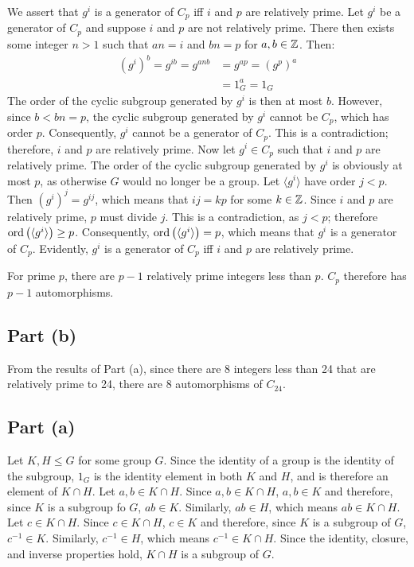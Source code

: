 \documentclass{article}
\begin{document}
We assert that $g^i$ is a generator of $C_p$ iff $i$ and $p$ are relatively prime. Let $g^i$ be a generator of $C_p$ and suppose $i$ and $p$ are not relatively prime. There then exists some integer $n > 1$ such that $an = i$ and $bn = p$ for $a, b \in \mathbb{Z}$. Then:
\begin{equation}
    \begin{split}
        \left(g^{i}\right)^b = g^{ib} = g^{anb} & = g^{ap} = \left(g^p\right)^a \\
        & = 1_G^a = 1_G
    \end{split}
\end{equation}
The order of the cyclic subgroup generated by $g^i$ is then at most $b$. However, since $b < bn = p$, the cyclic subgroup generated by $g^i$ cannot be $C_p$, which has order $p$. Consequently, $g^i$ cannot be a generator of $C_p$. This is a contradiction; therefore, $i$ and $p$ are relatively prime. Now let $g^i \in C_p$ such that $i$ and $p$ are relatively prime. The order of the cyclic subgroup generated by $g^i$ is obviously at most $p$, as otherwise $G$ would no longer be a group. Let $\langle g^i \rangle$ have order $j < p$. Then $\left(g^i\right)^j = g^{ij}$, which means that $ij = kp$ for some $k \in \mathbb{Z}$. Since $i$ and $p$ are relatively prime, $p$ must divide $j$. This is a contradiction, as $j < p$; therefore $\operatorname{ord}\left(\langle g^i \rangle\right) \geq p$. Consequently, $\operatorname{ord}\left(\langle g^i \rangle\right) = p$, which means that $g^i$ is a generator of $C_p$. Evidently, $g^i$ is a generator of $C_p$ iff $i$ and $p$ are relatively prime.

For prime $p$, there are $p - 1$ relatively prime integers less than $p$. $C_p$ therefore has $p - 1$ automorphisms.
\subsection*{Part (b)}
From the results of Part (a), since there are 8 integers less than 24 that are relatively prime to 24, there are 8 automorphisms of $C_{24}$.

\newpage

\subsection*{Part (a)}
Let $K, H \leq G$ for some group $G$. Since the identity of a group is the identity of the subgroup, $1_G$ is the identity element in both $K$ and $H$, and is therefore an element of $K \cap H$. Let $a, b \in K \cap H$. Since $a, b \in K \cap H$, $a, b \in K$ and therefore, since $K$ is a subgroup fo $G$, $ab \in K$. Similarly, $ab \in H$, which means $ab \in K \cap H$. Let $c \in K \cap H$. Since $c \in K \cap H$, $c \in K$ and therefore, since $K$ is a subgroup of $G$, $c^{-1} \in K$. Similarly, $c^{-1} \in H$, which means $c^{-1} \in K \cap H$. Since the identity, closure, and inverse properties hold, $K \cap H$ is a subgroup of $G$.
\end{document}
